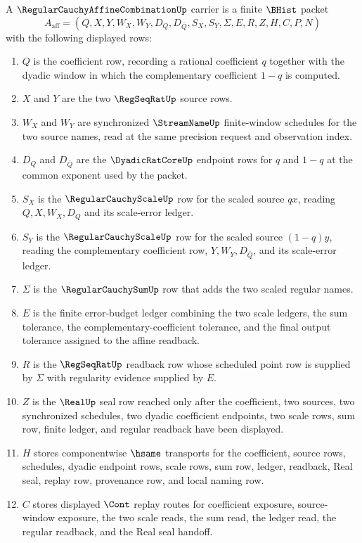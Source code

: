 \begin{definition}
\label{def:regular-cauchy-affine-combination-carrier}
A $\RegularCauchyAffineCombinationUp$ carrier is a finite $\BHist$ packet
$$
A_{\mathrm{aff}}=(Q,X,Y,W_X,W_Y,D_Q,D_{\bar Q},S_X,S_Y,\Sigma,E,R,Z,H,C,P,N)
$$
with the following displayed rows:
\begin{enumerate}
\item $Q$ is the coefficient row, recording a rational coefficient $q$ together with the dyadic window in which the complementary coefficient $1-q$ is computed.
\item $X$ and $Y$ are the two $\RegSeqRatUp$ source rows.
\item $W_X$ and $W_Y$ are synchronized $\StreamNameUp$ finite-window schedules for the two source names, read at the same precision request and observation index.
\item $D_Q$ and $D_{\bar Q}$ are the $\DyadicRatCoreUp$ endpoint rows for $q$ and $1-q$ at the common exponent used by the packet.
\item $S_X$ is the $\RegularCauchyScaleUp$ row for the scaled source $q x$, reading $Q,X,W_X,D_Q$ and its scale-error ledger.
\item $S_Y$ is the $\RegularCauchyScaleUp$ row for the scaled source $(1-q)y$, reading the complementary coefficient row, $Y,W_Y,D_{\bar Q}$, and its scale-error ledger.
\item $\Sigma$ is the $\RegularCauchySumUp$ row that adds the two scaled regular names.
\item $E$ is the finite error-budget ledger combining the two scale ledgers, the sum tolerance, the complementary-coefficient tolerance, and the final output tolerance assigned to the affine readback.
\item $R$ is the $\RegSeqRatUp$ readback row whose scheduled point row is supplied by $\Sigma$ with regularity evidence supplied by $E$.
\item $Z$ is the $\RealUp$ seal row reached only after the coefficient, two sources, two synchronized schedules, two dyadic coefficient endpoints, two scale rows, sum row, finite ledger, and regular readback have been displayed.
\item $H$ stores componentwise $\hsame$ transports for the coefficient, source rows, schedules, dyadic endpoint rows, scale rows, sum row, ledger, readback, Real seal, replay row, provenance row, and local naming row.
\item $C$ stores displayed $\Cont$ replay routes for coefficient exposure, source-window exposure, the two scale reads, the sum read, the ledger read, the regular readback, and the Real seal handoff.

\end{enumerate}
\end{definition}
